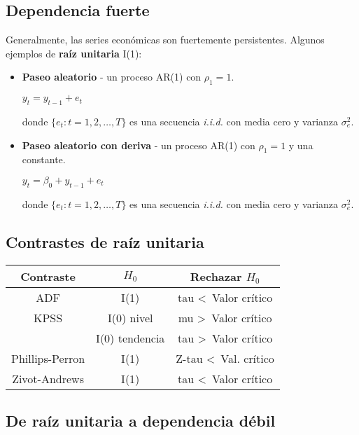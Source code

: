 \documentclass[10pt, a4paper, landscape]{article}
\begin{document}
\begin{multicols}{3}
\subsection*{Dependencia fuerte}

Generalmente, las series económicas son fuertemente persistentes. Algunos ejemplos de \textbf{raíz unitaria} I(1):

\begin{itemize}[leftmargin=*]
	\item \textbf{Paseo aleatorio} - un proceso AR(1) con \( \rho_{1} = 1 \).
	\begin{center}
		\( y_{t} = y_{t - 1} + e_{t} \)
	\end{center}
	donde \( \{ e_{t} : t = 1, 2, \ldots, T \} \) es una secuencia \textsl{i.i.d.} con media cero y varianza \( \sigma_{e}^{2} \).
	\item \textbf{Paseo aleatorio con deriva} - un proceso AR(1) con \( \rho_{1} = 1 \) y una constante.
	\begin{center}
		\( y_{t} = \beta_{0} + y_{t - 1} + e_{t} \)
	\end{center}
	donde \( \{ e_{t} : t = 1, 2, \ldots, T \} \) es una secuencia \textsl{i.i.d.} con media cero y varianza \( \sigma_{e}^{2} \).
\end{itemize}

\subsection*{Contrastes de raíz unitaria}

\begin{center}
	\begin{tabular}{ c | c | c }
		Contraste       & \( H_{0} \)    & Rechazar \( H_{0} \)              \\ \hline
		ADF             & I(1)           & tau \textless \, Valor crítico    \\ \hline
		KPSS            & I(0) nivel     & mu \textgreater \, Valor crítico  \\
		                & I(0) tendencia & tau \textgreater \, Valor crítico \\ \hline
		Phillips-Perron & I(1)           & Z-tau \textless \, Val. crítico   \\ \hline
		Zivot-Andrews   & I(1)           & tau \textless \, Valor crítico
	\end{tabular}
\end{center}

\subsection*{De raíz unitaria a dependencia débil}


\end{multicols}
\end{document}
